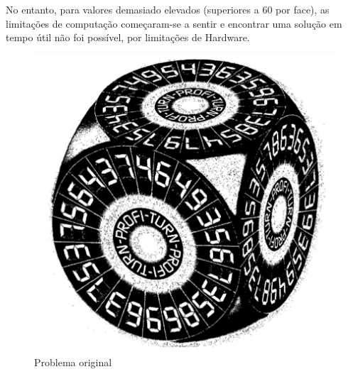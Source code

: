 No entanto, para valores demasiado elevados (superiores a 60 por face), as limitações de computação começaram-se a sentir e encontrar uma solução em tempo útil não foi possível, por limitações de Hardware.

\begin{figure}[h!]
\begin{center}
\includegraphics[scale=0.4]{turn12.png}
\caption{Problema original}
\label{fig:1}
\end{center}
\end{figure}

%
